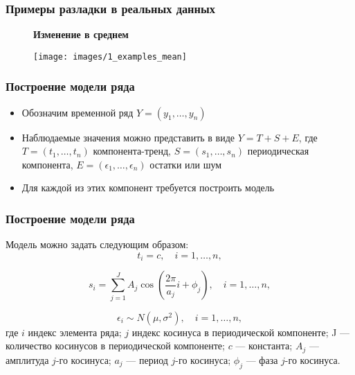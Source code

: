 \documentclass[intlimits, 9pt, unicode]{beamer}
\begin{document}
\begin{frame}
\frametitle{Примеры разладки в реальных данных}
\begin{figure}
\textbf{Изменение в среднем}\par\medskip
\texttt{[image: images/1\_examples\_mean]}
\end{figure}
\end{frame}

\begin{frame}
    \frametitle{Построение модели ряда}

    \begin{itemize}
    	\item Обозначим временной ряд $Y = (y_1, \dots, y_n)$
    \vspace{0.5cm}
	 \item Наблюдаемые значения можно представить в виде $Y = T + S + E$, где  $ T = (t_1, \dots, t_n) $ компонента-тренд, $ S = (s_1, \dots, s_n) $ периодическая компонента, $ E = (\epsilon_1, \dots, \epsilon_n) $ остатки или шум
    \vspace{0.5cm}
        \item Для каждой из этих компонент требуется построить модель
    \end{itemize}

\end{frame}


\begin{frame}
    \frametitle{Построение модели ряда}

Модель можно задать следующим образом:
\begin{equation*}
t_i = c, \quad i = 1, \dots, n, 
\end{equation*}

\begin{equation*}
s_i = \sum_{j=1}^{J}{A_j \cos \left( \frac{2\pi}{a_j} i + \phi_j \right)}, \quad i = 1, \dots, n,
\end{equation*}

\begin{equation*}
\epsilon_i \sim N(\mu, \sigma^2), \quad i = 1, \dots, n, 
\end{equation*}
где $i$ индекс элемента ряда; $j$ индекс косинуса в периодической компоненте; J --- количество косинусов в периодической компоненте; $c$ --- константа; $A_j$ --- амплитуда $j$-го косинуса; $a_j$ --- период $j$-го косинуса; $\phi_j$ --- фаза $j$-го косинуса.

\end{frame}
\end{document}
